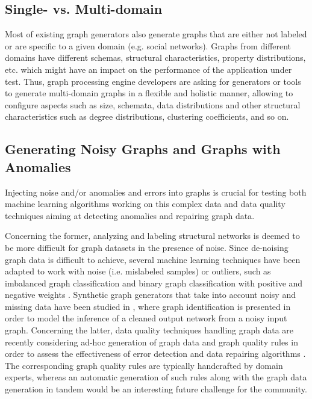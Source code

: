 \subsection{Single- vs. Multi-domain}

Most of existing graph generators also generate graphs that are either not labeled or
are specific to a given domain (e.g.  social networks). Graphs from different
domains have different schemas, structural characteristics, property
distributions, etc. which might have an impact on the performance of the
application under test. Thus, graph processing engine developers are asking for
generators or tools to generate multi-domain graphs  in a flexible and holistic manner, allowing to configure aspects
such as size, schemata, data distributions and other structural
characteristics such as degree distributions, clustering coefficients, and
so on.

\subsection{Generating Noisy Graphs and Graphs with Anomalies}
Injecting noise and/or anomalies and errors into graphs is crucial for
testing both machine learning algorithms working on this complex data and
data quality techniques aiming at detecting anomalies and repairing graph
data.

Concerning the former, analyzing and labeling structural networks is
deemed to be more difficult for graph datasets in the presence of noise.
Since de-noising graph data is difficult to achieve, several machine learning
techniques have been adapted to work with noise (i.e. mislabeled
samples) or outliers, such as
imbalanced graph classification \cite{PanZ13} and
binary graph classification with positive and negative weights \cite{CheungSML16}.
Synthetic graph generators that take into account noisy and missing data
have been studied in \cite{NamataG10}, where graph identification is presented in
order to  model the inference of a cleaned output network from a
noisy input graph.
Concerning the latter, data quality techniques handling graph data are recently considering ad-hoc
generation of graph data and graph quality rules in order to assess the
effectiveness of error detection and data repairing algorithms \cite{FanWX16a,AriouaB18}. The
corresponding graph quality rules are typically handcrafted by domain
experts, whereas an automatic generation of such rules along with the graph
data generation in tandem would be an interesting future challenge for the
community.

